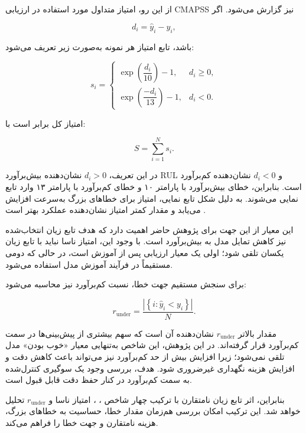 از این رو، امتیاز متداول مورد استفاده در ارزیابی CMAPSS نیز
گزارش می‌شود. اگر

\begin{equation}
	d_i=\hat{y}_i-y_i,
\end{equation}

باشد، تابع امتیاز هر نمونه به‌صورت زیر تعریف می‌شود:

\begin{equation}
	\label{eq:nasa-score}
	s_i
	=
	\begin{cases}
		\exp\left(\dfrac{d_i}{10}\right)-1,
		& d_i \geq 0,\\[8pt]
		\exp\left(\dfrac{-d_i}{13}\right)-1,
		& d_i < 0.
	\end{cases}
\end{equation}

امتیاز کل برابر است با:

\begin{equation}
	\label{eq:nasa-score-total}
	S
	=
	\sum_{i=1}^{N}s_i.
\end{equation}

در این تعریف، $d_i>0$ نشان‌دهنده بیش‌برآورد \gls{RUL} و
$d_i<0$ نشان‌دهنده کم‌برآورد است. بنابراین، خطای بیش‌برآورد با
پارامتر ۱۰ و خطای کم‌برآورد با پارامتر ۱۳ وارد تابع نمایی
می‌شوند. به دلیل شکل تابع نمایی، امتیاز برای خطاهای بزرگ به‌سرعت
افزایش می‌یابد و مقدار کمتر امتیاز نشان‌دهنده عملکرد بهتر است
\cite{NASA2007C-MAPSS}.

این معیار از این جهت برای پژوهش حاضر اهمیت دارد که هدف تابع
زیان انتخاب‌شده نیز کاهش تمایل مدل به بیش‌برآورد است. با وجود
این، امتیاز ناسا نباید با تابع زیان  یکسان تلقی شود؛
اولی یک معیار ارزیابی پس از آموزش است، در حالی که دومی مستقیماً
در فرآیند آموزش مدل استفاده می‌شود.

برای سنجش مستقیم جهت خطا، نسبت کم‌برآورد نیز محاسبه می‌شود:

\begin{equation}
	\label{eq:bias-ratio}
	r_{\mathrm{under}}
	=
	\frac{
		\left|
		\left\{
		i:\hat{y}_i<y_i
		\right\}
		\right|
	}{
		N
	}.
\end{equation}

مقدار بالاتر $r_{\mathrm{under}}$ نشان‌دهنده آن است که سهم بیشتری
از پیش‌بینی‌ها در سمت کم‌برآورد قرار گرفته‌اند. در این پژوهش،
این شاخص به‌تنهایی معیار «خوب بودن» مدل تلقی نمی‌شود؛ زیرا
افزایش بیش از حد کم‌برآورد نیز می‌تواند باعث کاهش دقت و افزایش
هزینه نگهداری غیرضروری شود. هدف، بررسی وجود یک سوگیری کنترل‌شده
به سمت کم‌برآورد در کنار حفظ دقت قابل قبول است.

بنابراین، اثر تابع زیان نامتقارن با ترکیب چهار شاخص
، ، امتیاز ناسا و $r_{\mathrm{under}}$ تحلیل
خواهد شد. این ترکیب امکان بررسی هم‌زمان مقدار خطا، حساسیت به
خطاهای بزرگ، هزینه نامتقارن و جهت خطا را فراهم می‌کند.

